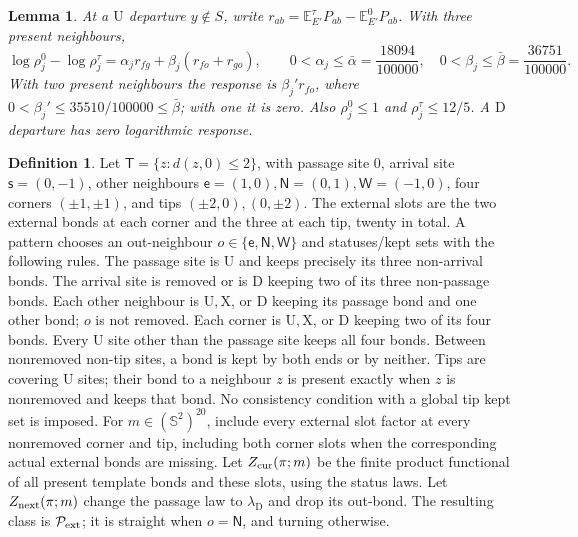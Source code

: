 \documentclass[11pt,reqno]{amsart}
\newtheorem{lemma}[theorem]{Lemma}
\theoremstyle{definition}
\newtheorem{definition}[theorem]{Definition}
\theoremstyle{remark}
\begin{document}
\begin{lemma}\label{l:response}
At a \(\mathrm U\) departure \(y\notin S\), write
\(r_{ab}=\mathbb E^\tau_{E'}P_{ab}-\mathbb E^0_{E'}P_{ab}\).
With three present neighbours,
\[
 \log\rho_j^0-\log\rho_j^\tau
       =\alpha_jr_{fg}+\beta_j(r_{fo}+r_{go}),\qquad
 0<\alpha_j\le\bar\alpha=\frac{18094}{100000},\quad
 0<\beta_j\le\bar\beta=\frac{36751}{100000}.
\]
With two present neighbours the response is \(\beta_j'r_{fo}\),
where \(0<\beta_j'\le35510/100000\le\bar\beta\);
with one it is zero. Also \(\rho_j^0\le1\) and
\(\rho_j^\tau\le12/5\).
A \(\mathrm D\) departure has zero logarithmic response.
\end{lemma}

\begin{definition}\label{d:pattern}
Let \(\mathsf T=\{z:d(z,0)\le2\}\), with passage site \(0\),
arrival site \(\mathsf s=(0,-1)\), other neighbours
\(\mathsf e=(1,0),\mathsf N=(0,1),\mathsf W=(-1,0)\),
four corners \((\pm1,\pm1)\), and tips \((\pm2,0),(0,\pm2)\).
The external slots are the two external bonds at each corner and
the three at each tip, twenty in total.
A pattern chooses an out-neighbour \(o\in\{\mathsf e,\mathsf N,\mathsf W\}\)
and statuses/kept sets with the following rules.
The passage site is \(\mathrm U\) and keeps precisely its three
non-arrival bonds. The arrival site is removed or is \(\mathrm D\)
keeping two of its three non-passage bonds.
Each other neighbour is \(\mathrm U,\mathrm X\), or \(\mathrm D\)
keeping its passage bond and one other bond; \(o\) is not removed.
Each corner is \(\mathrm U,\mathrm X\), or \(\mathrm D\) keeping
two of its four bonds. Every \(\mathrm U\) site other than the
passage site keeps all four bonds.
Between nonremoved non-tip sites, a bond is kept by both ends or
by neither. Tips are covering \(\mathrm U\) sites; their bond to
a neighbour \(z\) is present exactly when \(z\) is nonremoved and
keeps that bond. No consistency condition with a global tip kept
set is imposed.
For \(m\in(\mathbb S^2)^{20}\), include every external slot factor
at every nonremoved corner and tip, including both corner slots
when the corresponding actual external bonds are missing.
Let \(Z_{\rm cur}(\pi;m)\) be the finite product functional of
all present template bonds and these slots, using the status laws.
Let \(Z_{\rm next}(\pi;m)\) change the passage law to
\(\lambda_{\mathrm D}\) and drop its out-bond.
The resulting class is \(\mathcal P_{\rm ext}\); it is straight
when \(o=\mathsf N\), and turning otherwise.
\end{definition}
\end{document}
